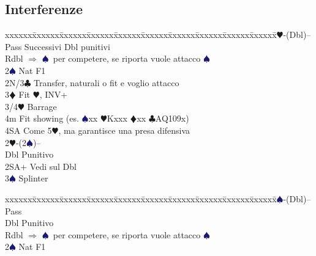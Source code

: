 \documentclass[a4paper,italian]{article}
\newcommand{\BC}{\textcolor{OliveGreen}{$\clubsuit$}}
\newcommand{\BD}{\textcolor{RedOrange}{$\vardiamondsuit$}}
\newcommand{\BH}{\textcolor{Red2}{$\varheartsuit${}}}
\newcommand{\BS}{\textcolor{MidnightBlue}{$\spadesuit${}}}
\newenvironment{bidtable}
{\begin{tabbing}

    xxxxxx\=xxxxxx\=xxxxxx\=xxxxxx\=xxxxxx\=xxxxxx\=xxxxxx\=xxxxxx\=xxxxxx\=xxxxxx\=\kill}
{\end{tabbing} }%
\begin{document}
\begin{multicols*}{2}
                                        \subsection{Interferenze}

                                        \begin{bidtable}
                                            2\BH-(Dbl)--\\
                                            Pass\> Successivi Dbl punitivi\\
                                            Rdbl\> $\Rightarrow$ \BS\ per competere, se riporta vuole attacco \BS\\
                                            2\BS\> Nat F1\\
                                            2N/3\BC\> Transfer, naturali o fit e voglio attacco\\
                                            3\BD\> Fit \BH, INV+\\
                                            3/4\BH\> Barrage\\
                                            4m\> Fit showing (es. \BS xx \BH Kxxx \BD xx \BC AQ109x)\\
                                            4SA\> Come 5\BH, ma garantisce una presa difensiva\\
                                            2\BH-(2\BS)--\\
                                            Dbl\> Punitivo\\
                                            2SA+\> Vedi sul Dbl\\
                                            3\BS\> Splinter\\
                                            \end{bidtable}
                                            \begin{bidtable}
                                            2\BS-(Dbl)--\\
                                            Pass\+\\
                                            Dbl\> Punitivo\-\\
                                            Rdbl\> $\Rightarrow$ \BS\ per competere, se riporta vuole attacco \BS\\
                                            2\BS\> Nat F1\\

\end{bidtable}
\end{multicols*}
\end{document}
